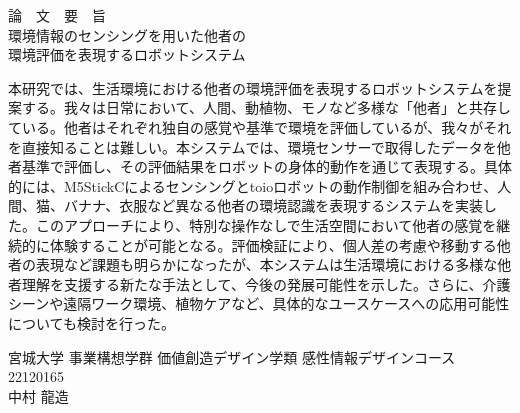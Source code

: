\begin{center}
  {\Large
    論　文　要　旨\\
    \vspace{2\zh}
    環境情報のセンシングを用いた他者の\\環境評価を表現するロボットシステム\\
    \vspace{2\zh}
  }
\end{center}

{\normalfont
  本研究では、生活環境における他者の環境評価を表現するロボットシステムを提案する。我々は日常において、人間、動植物、モノなど多様な「他者」と共存している。他者はそれぞれ独自の感覚や基準で環境を評価しているが、我々がそれを直接知ることは難しい。本システムでは、環境センサーで取得したデータを他者基準で評価し、その評価結果をロボットの身体的動作を通じて表現する。具体的には、M5StickCによるセンシングとtoioロボットの動作制御を組み合わせ、人間、猫、バナナ、衣服など異なる他者の環境認識を表現するシステムを実装した。このアプローチにより、特別な操作なしで生活空間において他者の感覚を継続的に体験することが可能となる。評価検証により、個人差の考慮や移動する他者の表現など課題も明らかになったが、本システムは生活環境における多様な他者理解を支援する新たな手法として、今後の発展可能性を示した。さらに、介護シーンや遠隔ワーク環境、植物ケアなど、具体的なユースケースへの応用可能性についても検討を行った。
}

\vspace{3\zh}

\begin{flushright}
  宮城大学 事業構想学群 価値創造デザイン学類 感性情報デザインコース\\
  22120165\\ %
  中村 龍造\\ %
\end{flushright}

